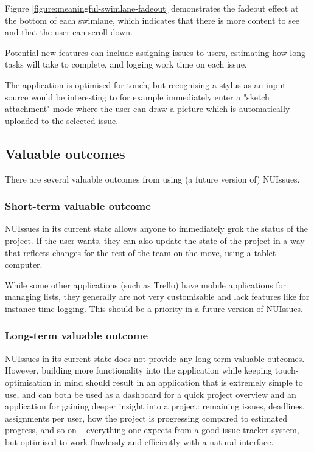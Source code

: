 Figure \ref{figure:meaningful-swimlane-fadeout} demonstrates the fadeout effect at the bottom of each swimlane, which indicates that there is more content to see and that the user can scroll down.

Potential new features can include assigning issues to users, estimating how long tasks will take to complete, and logging work time on each issue.

The application is optimised for touch, but recognising a stylus as an input source would be interesting to for example immediately enter a "sketch attachment" mode where the user can draw a picture which is automatically uploaded to the selected issue.

\subsection{Valuable outcomes}

There are several valuable outcomes from using (a future version of) NUIssues.

\subsubsection{Short-term valuable outcome}

NUIssues in its current state allows anyone to immediately grok the status of the project. If the user wants, they can also update the state of the project in a way that reflects changes for the rest of the team on the move, using a tablet computer.

While some other applications (such as Trello) have mobile applications for managing lists, they generally are not very customisable and lack features like for instance time logging. This should be a priority in a future version of NUIssues.

\subsubsection{Long-term valuable outcome}

NUIssues in its current state does not provide any long-term valuable outcomes. However, building more functionality into the application while keeping touch-optimisation in mind should result in an application that is extremely simple to use, and can both be used as a dashboard for a quick project overview and an application for gaining deeper insight into a project: remaining issues, deadlines, assignments per user, how the project is progressing compared to estimated progress, and so on -- everything one expects from a good issue tracker system, but optimised to work flawlessly and efficiently with a natural interface.

